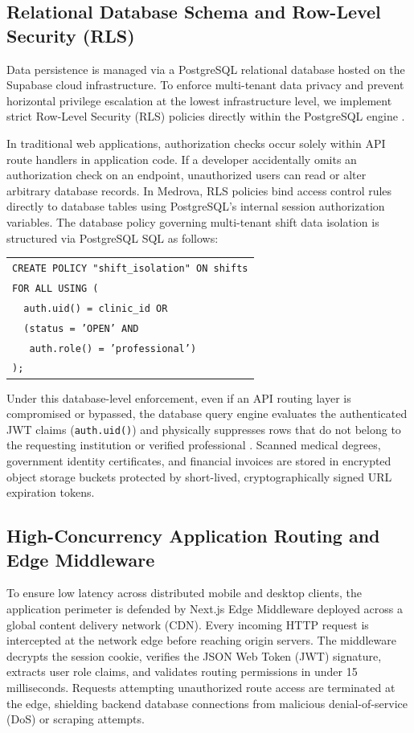 \documentclass[conference]{IEEEtran}
\begin{document}
\subsection{Relational Database Schema and Row-Level Security (RLS)}
Data persistence is managed via a PostgreSQL relational database hosted on the Supabase cloud infrastructure. To enforce multi-tenant data privacy and prevent horizontal privilege escalation at the lowest infrastructure level, we implement strict Row-Level Security (RLS) policies directly within the PostgreSQL engine \cite{supabase2024rls}.

In traditional web applications, authorization checks occur solely within API route handlers in application code. If a developer accidentally omits an authorization check on an endpoint, unauthorized users can read or alter arbitrary database records. In Medrova, RLS policies bind access control rules directly to database tables using PostgreSQL's internal session authorization variables. The database policy governing multi-tenant shift data isolation is structured via PostgreSQL SQL as follows:

\begin{center}
\small
\begin{tabular}{|l|}
\hline
\texttt{CREATE POLICY "shift\_isolation" ON shifts} \\
\texttt{FOR ALL USING (} \\
\texttt{~~auth.uid() = clinic\_id OR} \\
\texttt{~~(status = 'OPEN' AND} \\
\texttt{~~~auth.role() = 'professional')} \\
\texttt{);} \\
\hline
\end{tabular}
\end{center}

Under this database-level enforcement, even if an API routing layer is compromised or bypassed, the database query engine evaluates the authenticated JWT claims (\texttt{auth.uid()}) and physically suppresses rows that do not belong to the requesting institution or verified professional \cite{supabase2024rls}. Scanned medical degrees, government identity certificates, and financial invoices are stored in encrypted object storage buckets protected by short-lived, cryptographically signed URL expiration tokens.

\subsection{High-Concurrency Application Routing and Edge Middleware}
To ensure low latency across distributed mobile and desktop clients, the application perimeter is defended by Next.js Edge Middleware deployed across a global content delivery network (CDN). Every incoming HTTP request is intercepted at the network edge before reaching origin servers. The middleware decrypts the session cookie, verifies the JSON Web Token (JWT) signature, extracts user role claims, and validates routing permissions in under 15 milliseconds. Requests attempting unauthorized route access are terminated at the edge, shielding backend database connections from malicious denial-of-service (DoS) or scraping attempts.
\end{document}
